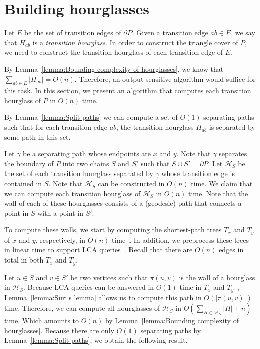 \documentclass[a4paper,UKenglish]{lipics}
\newcommand{\p}[2]{\ensuremath{\pi(#1, #2)}}
\begin{document}
\section{Building hourglasses}\label{Section: Building hourglasses}

Let $E$ be the set of transition edges of $\partial P$.
Given a transition edge $ab\in E$, we say that $H_{ab}$ is a \emph{transition hourglass}.
In order to construct the triangle cover of $P$, 
we need to construct the transition hourglass of each transition edge of $E$.

By Lemma~\ref{lemma:Bounding complexity of hourglasses}, we know that $\sum_{ab\in E} |H_{ab}| = O(n)$.
Therefore, an output sensitive algorithm would suffice for this task. 
In this section, we present an algorithm that computes each transition hourglass of $P$ in $O(n)$ time.

By Lemma~\ref{lemma:Split paths} we can compute a set of $O(1)$ separating paths such that for each transition edge $ab$, the transition hourglass $H_{ab}$ is separated by some path in this set.

Let $\gamma$ be a separating path whose endpoints are $x$ and $y$. 
Note that $\gamma$ separates the boundary of $P$ into two chains $S$ and $S'$ such that $S\cup S' = \partial P$.
Let $\mathcal H_S$ be the set of each transition hourglass separated by $\gamma$ whose transition edge is contained in $S$.
Note that $\mathcal H_S$ can be constructed in $O(n)$ time.
We claim that we can compute each transition hourglass of $\mathcal H_S$ in $O(n)$ time.
Note that the wall of each of these hourglasses consists of a (geodesic) path that connects a point in $S$ with a point in $S'$.

To compute these walls, we start by computing the shortest-path trees $T_x$ and $T_y$ of $x$ and $y$, respectively, in $O(n)$ time~\cite{guibasShortestPathTree}. 
In addition, we preprocess these trees in linear time to support LCA queries~\cite{harel1984fast}.
Recall that there are $O(n)$ edges in total in both $T_x$ and $T_y$.

Let $u\in S$ and $v\in S'$ be two vertices such that $\p{u}{v}$ is the wall of a hourglass in $\mathcal H_S$.
Because LCA queries can be answered in $O(1)$ time in $T_x$ and $T_y$~\cite{harel1984fast}, 
Lemma~\ref{lemma:Suri's lemma} allows us to compute this path in $O(|\p{u}{v}|)$ time. 
Therefore, we can compute all hourglasses of $\mathcal H_S$ in $O(\sum_{H\in \mathcal H_S} |H| + n)$ time. 
Which amounts to $O(n)$ by Lemma~\ref{lemma:Bounding complexity of hourglasses}. 
Because there are only $O(1)$ separating paths by Lemma~\ref{lemma:Split paths}, we obtain the following result.
\end{document}
